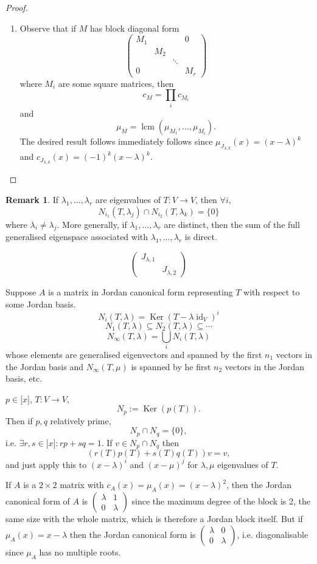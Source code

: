 \documentclass[a4paper]{article}
\newcommand{\Ker}{\operatorname{Ker}}
\newcommand{\lcm}{\operatorname{lcm}}
\newcommand{\id}{\operatorname{id}}
\theoremstyle{definition}
\newtheorem*{remark}{Remark}
\begin{document}
\begin{proof}
\begin{enumerate}
    \item Observe that if $M$ has block diagonal form
\[
\begin{pmatrix}M_1 & & & 0\\ & M_2 & & \\ & & \ddots & \\ 0 & & & M_r\end{pmatrix}
\]
where $M_i$ are some square matrices, then
\[
c_{M}=\prod_i c_{M_i}
\]
and
\[
\mu_{M}=\lcm (\mu_{M_1},\ldots,\mu_{M_i}) .
\]
The desired result follows immediately follows since $\mu_{J_{\lambda,k}}(x)=(x-\lambda)^k$ and $c_{J_{\lambda,k}}(x)=(-1)^k(x-\lambda)^k$.
\end{enumerate}
\end{proof}

\begin{remark}
    If $\lambda_1,\ldots,\lambda_r$ are eigenvalues of $T:V\rightarrow V$, then $\forall i$,
\[
N_{i_1} (T,\lambda_{j}) \cap N_{i_2} (T,\lambda_{k})=\{0\}
\]
where $\lambda_i \neq \lambda_j$. More generally, if $\lambda_1,\ldots,\lambda_r$ are distinct, then the sum of the full generalised eigenspace associated with $\lambda_1,\ldots,\lambda_r$ is direct.
    
\[
\begin{pmatrix}
    J_{\lambda,1} & \\ & J_{\lambda,2}
    \end{pmatrix}
\]
    
    Suppose $A$ is a matrix in Jordan canonical form representing $T$ with respect to some Jordan basis.
\[
N_i (T,\lambda)=\Ker (T-\lambda \id_V)^i
\]
\[
N_1(T,\lambda) \subseteq N_2(T,\lambda) \subseteq \cdots
\]
\[
N_\infty (T,\lambda) = \bigcup_i N_i (T,\lambda)
\]
whose elements are generalised eigenvectors and spanned by the first $n_1$ vectors in the Jordan basis and $N_\infty (T,\mu)$ is spanned by he first $n_2$ vectors in the Jordan basis, etc.
    
    $p\in \mathbb [x]$, $T:V\rightarrow V$,
\[
N_p := \Ker (p(T)).
\]
Then if $p,q$ relatively prime,
\[
N_p \cap N_q=\{0\},
\]
i.e. $\exists r,s \in \mathbb [x]:rp+sq=1$. If $v\in N_p \cap N_q$ then
\[
(r(T)p(T)+s(T)q(T))v=v,
\]
and just apply this to $(x-\lambda)^i$ and $(x-\mu)^j$ for $\lambda,\mu$ eigenvalues of $T$.
\end{remark}

If $A$ is a $2\times 2$ matrix with $c_{A}(x)=\mu_{A}(x)=(x-\lambda)^2$, then the Jordan canonical form of $A$ is $\begin{pmatrix}\lambda & 1\\0& \lambda\end{pmatrix}$ since the maximum degree of the block is 2, the same size with the whole matrix, which is therefore a Jordan block itself. But if $\mu_{A}(x)=x-\lambda$ then the Jordan canonical form is $\begin{pmatrix}\lambda & 0\\0& \lambda\end{pmatrix}$, i.e. diagonalisable since $\mu_{A}$ has no multiple roots.
\end{document}
